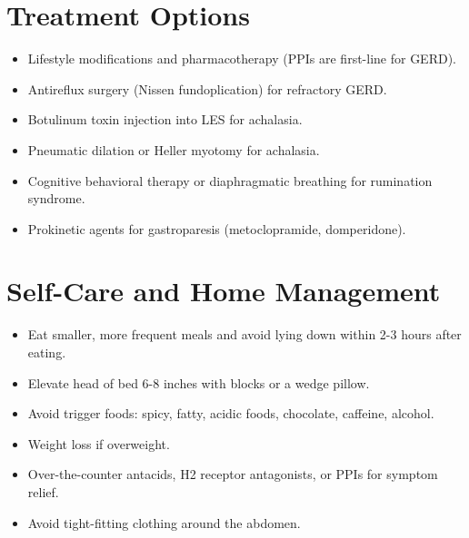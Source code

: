 \section*{Treatment Options}
\begin{itemize}
  \item Lifestyle modifications and pharmacotherapy (PPIs are first-line for GERD).
  \item Antireflux surgery (Nissen fundoplication) for refractory GERD.
  \item Botulinum toxin injection into LES for achalasia.
  \item Pneumatic dilation or Heller myotomy for achalasia.
  \item Cognitive behavioral therapy or diaphragmatic breathing for rumination syndrome.
  \item Prokinetic agents for gastroparesis (metoclopramide, domperidone).
\end{itemize}

\section*{Self-Care and Home Management}
\begin{itemize}
  \item Eat smaller, more frequent meals and avoid lying down within 2-3 hours after eating.
  \item Elevate head of bed 6-8 inches with blocks or a wedge pillow.
  \item Avoid trigger foods: spicy, fatty, acidic foods, chocolate, caffeine, alcohol.
  \item Weight loss if overweight.
  \item Over-the-counter antacids, H2 receptor antagonists, or PPIs for symptom relief.
  \item Avoid tight-fitting clothing around the abdomen.
\end{itemize}

